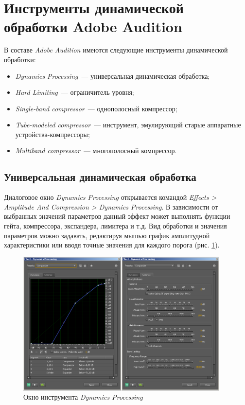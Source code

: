 \documentclass[oneside, final, 14pt]{extreport}
\begin{document}
\section{Инструменты динамической обработки Adobe Audition}
В составе \emph{Adobe Audition} имеются следующие инструменты динамической обработки:
\begin{itemize}
  \item \emph{Dynamics Processing}~--- универсальная динамическая обработка;
  \item \emph{Hard Limiting}~--- ограничитель уровня;
  \item \emph{Single-band compressor}~--- однополосный компрессор;
  \item \emph{Tube-modeled compressor}~--- инструмент, эмулирующий старые аппаратные устройства-компрессоры;
  \item \emph{Multiband compressor}~--- многополосный компрессор.
\end{itemize}

\subsection{Универсальная динамическая обработка}
Диалоговое окно \emph{Dynamics Processing} открывается командой \emph{Effects > Amplitude And Compression > Dynamics Processing}.
В зависимости от выбранных значений параметров данный эффект может выполнять функции гейта, компрессора, экспандера, лимитера и т.д. Вид обработки и значения параметров можно задавать, редактируя мышью график амплитудной характеристики или вводя точные значения для каждого порога (рис. \ref{pic-dynamic-01}).

\begin{figure}[h!]
  \centering
  \includegraphics[width=0.95\textwidth]{pic-dynamic-01}
  \caption{Окно инструмента \emph{Dynamics Processing}}
  \label{pic-dynamic-01}
\end{figure}
\end{document}
